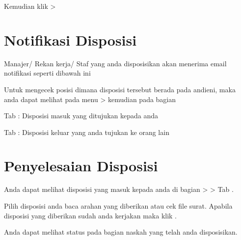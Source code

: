 \documentclass[letterpaper,10pt,bahasai]{sphinxmanual}
\begin{document}
Kemudian klik \sphinxhyphen{}\textgreater{} 

\noindent{}


\section{Notifikasi Disposisi}
\label{\detokenize{disposisi:notifikasi-disposisi}}
Manajer/ Rekan kerja/ Staf yang anda disposisikan akan menerima email notifikasi seperti dibawah ini

\noindent{}

Untuk mengecek posisi dimana disposisi tersebut berada pada andieni, maka anda dapat melihat pada menu \sphinxhyphen{}\textgreater{} 
kemudian pada bagian 

\noindent{}

\begin{DUlineblock}{0em}
\item[] Tab      : Disposisi masuk yang ditujukan kepada anda
\item[] Tab     : Disposisi keluar yang anda tujukan ke orang lain
\end{DUlineblock}


\section{Penyelesaian Disposisi}
\label{\detokenize{disposisi:penyelesaian-disposisi}}
Anda dapat melihat disposisi yang masuk kepada anda di bagian  \sphinxhyphen{}\textgreater{}  \sphinxhyphen{}\textgreater{} Tab .

\noindent{}

Pilih disposisi anda baca arahan yang diberikan atau cek file surat. Apabila disposisi yang diberikan sudah anda kerjakan
maka klik .

\noindent{}

Anda dapat melihat  status pada bagian naskah yang telah anda disposisikan.

\noindent{}
\end{document}
